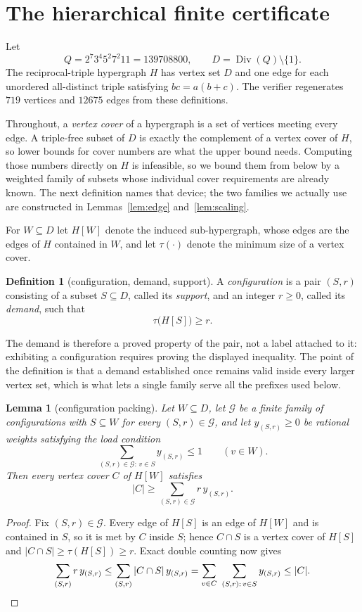 \documentclass[11pt]{article}
\newtheorem{lemma}[theorem]{Lemma}
\theoremstyle{definition}
\newtheorem{definition}[theorem]{Definition}
\theoremstyle{plain}
\begin{document}
\section{The hierarchical finite certificate}

Let
\[
 Q=2^7 3^4 5^2 7^2 11=139708800,
 \qquad D=\operatorname{Div}(Q)\setminus\{1\}.
\]
The reciprocal-triple hypergraph $H$ has vertex set $D$ and one edge for each
unordered all-distinct triple satisfying $bc=a(b+c)$.  The verifier
regenerates $719$ vertices and $12675$ edges from these definitions.

Throughout, a \emph{vertex cover} of a hypergraph is a set of vertices
meeting every edge.  A triple-free subset of $D$ is exactly the complement of
a vertex cover of $H$, so lower bounds for cover numbers are what the upper
bound needs.  Computing those numbers directly on $H$ is infeasible, so we
bound them from below by a weighted family of subsets whose individual cover
requirements are already known.  The next definition names that device; the
two families we actually use are constructed in Lemmas~\ref{lem:edge}
and~\ref{lem:scaling}.

For $W\subseteq D$ let $H[W]$ denote the induced sub-hypergraph, whose edges
are the edges of $H$ contained in $W$, and let $\tau(\cdot)$ denote the
minimum size of a vertex cover.

\begin{definition}[configuration, demand, support]\label{def:configuration}
A \emph{configuration} is a pair $(S,r)$ consisting of a subset $S\subseteq
D$, called its \emph{support}, and an integer $r\geq0$, called its
\emph{demand}, such that
\[
 \tau\bigl(H[S]\bigr)\geq r .
\]
\end{definition}

The demand is therefore a proved property of the pair, not a label attached
to it: exhibiting a configuration requires proving the displayed inequality.
The point of the definition is that a demand established once remains valid
inside every larger vertex set, which is what lets a single family serve all
the prefixes used below.

\begin{lemma}[configuration packing]\label{lem:packing}
Let $W\subseteq D$, let $\mathcal G$ be a finite family of configurations
with $S\subseteq W$ for every $(S,r)\in\mathcal G$, and let
$y_{(S,r)}\geq0$ be rational weights satisfying the load condition
\[
 \sum_{(S,r)\in\mathcal G:\,v\in S}y_{(S,r)}\leq1\qquad(v\in W).
\]
Then every vertex cover $C$ of $H[W]$ satisfies
\[
 |C|\geq\sum_{(S,r)\in\mathcal G}r\,y_{(S,r)}.
\]
\end{lemma}
\begin{proof}
Fix $(S,r)\in\mathcal G$.  Every edge of $H[S]$ is an edge of $H[W]$ and is
contained in $S$, so it is met by $C$ inside $S$; hence $C\cap S$ is a vertex
cover of $H[S]$ and $|C\cap S|\geq\tau(H[S])\geq r$.  Exact double counting
now gives
\[
 \sum_{(S,r)}r\,y_{(S,r)}
 \leq\sum_{(S,r)}|C\cap S|\,y_{(S,r)}
 =\sum_{v\in C}\ \sum_{(S,r):\,v\in S}y_{(S,r)}
 \leq|C|.\qedhere
\]
\end{proof}
\end{document}
